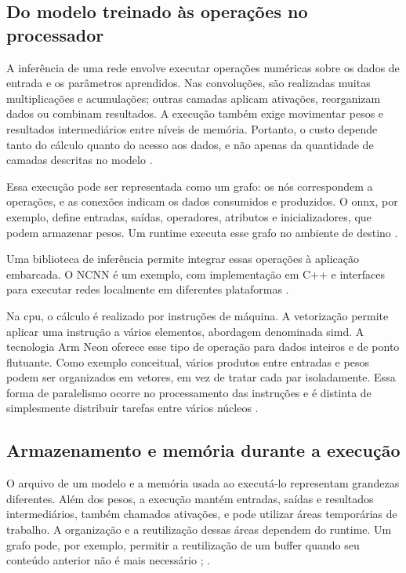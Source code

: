 \subsection{Do modelo treinado às operações no processador}
\label{subsec:operacoes-processador}

A inferência de uma rede envolve executar operações numéricas sobre os dados de entrada e os parâmetros aprendidos. Nas convoluções, são realizadas muitas multiplicações e acumulações; outras camadas aplicam ativações, reorganizam dados ou combinam resultados. A execução também exige movimentar pesos e resultados intermediários entre níveis de memória. Portanto, o custo depende tanto do cálculo quanto do acesso aos dados, e não apenas da quantidade de camadas descritas no modelo \cite[seções III e V]{sze}.

Essa execução pode ser representada como um grafo: os nós correspondem a operações, e as conexões indicam os dados consumidos e produzidos. O \gls{onnx}, por exemplo, define entradas, saídas, operadores, atributos e inicializadores, que podem armazenar pesos. Um runtime executa esse grafo no ambiente de destino \cite{onnx}.

Uma biblioteca de inferência permite integrar essas operações à aplicação embarcada. O NCNN é um exemplo, com implementação em C++ e interfaces para executar redes localmente em diferentes plataformas \cite{ncnn}.

Na \gls{cpu}, o cálculo é realizado por instruções de máquina. A vetorização permite aplicar uma instrução a vários elementos, abordagem denominada \gls{simd}. A tecnologia Arm Neon oferece esse tipo de operação para dados inteiros e de ponto flutuante. Como exemplo conceitual, vários produtos entre entradas e pesos podem ser organizados em vetores, em vez de tratar cada par isoladamente. Essa forma de paralelismo ocorre no processamento das instruções e é distinta de simplesmente distribuir tarefas entre vários núcleos \cite{arm-neon}.

\subsection{Armazenamento e memória durante a execução}
\label{subsec:armazenamento-memoria}

O arquivo de um modelo e a memória usada ao executá-lo representam grandezas diferentes. Além dos pesos, a execução mantém entradas, saídas e resultados intermediários, também chamados ativações, e pode utilizar áreas temporárias de trabalho. A organização e a reutilização dessas áreas dependem do runtime. Um grafo pode, por exemplo, permitir a reutilização de um buffer quando seu conteúdo anterior não é mais necessário \cite[seções V e VIII]{sze}; \cite{onnx}.

